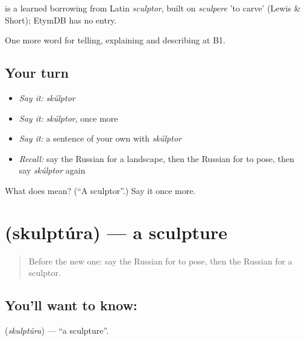 \begin{cousinweb}
\emph{} is a learned borrowing from Latin \emph{sculptor}, built on \emph{sculpere} 'to carve' (Lewis \& Short); EtymDB has no entry.
\end{cousinweb}

\begin{grammarlens}[title={What you've built}]
One more word for telling, explaining and describing at B1.
\end{grammarlens}

\subsection*{Your turn}
\begin{itemize}
\raggedright
  \item \emph{Say it:} \emph{skúlptor}
  \item \emph{Say it:} \emph{skúlptor}, once more
  \item \emph{Say it:} a sentence of your own with \emph{skúlptor}
  \item \emph{Recall:} say the Russian for a landscape, then the Russian for to pose, then say \emph{skúlptor} again
\end{itemize}

\begin{tcolorbox}[breakable,colback=teal!4,colframe=teal!35!black,title={Before you move on}]
What does  mean? (\textquotedblleft{}A sculptor\textquotedblright{}.) Say it once more.
\end{tcolorbox}
\section[\texorpdfstring{\ru{скульптура} (skulptúra)}{скульптура (skulptúra)}]{ (skulptúra) — a sculpture}

\label{lesson:RU-C522-skulptura}



\begin{quote}
Before the new one: say the Russian for to pose, then the Russian for a sculptor.
\end{quote}

\subsection*{You'll want to know: }
\textbf{} (\emph{skulptúra}) — \textquotedblleft{}a sculpture\textquotedblright{}.

